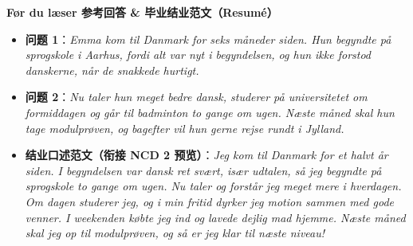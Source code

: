 \begin{answerbox}
\textbf{Før du læser 参考回答 \& 毕业结业范文（Resumé）}
\begin{itemize}
  \item \textbf{问题 1}：\textit{Emma kom til Danmark for seks måneder siden. Hun begyndte på sprogskole i Aarhus, fordi alt var nyt i begyndelsen, og hun ikke forstod danskerne, når de snakkede hurtigt.}
  \item \textbf{问题 2}：\textit{Nu taler hun meget bedre dansk, studerer på universitetet om formiddagen og går til badminton to gange om ugen. Næste måned skal hun tage modulprøven, og bagefter vil hun gerne rejse rundt i Jylland.}
  \item \textbf{结业口述范文（衔接 NCD 2 预览）}：\textit{Jeg kom til Danmark for et halvt år siden. I begyndelsen var dansk ret svært, især udtalen, så jeg begyndte på sprogskole to gange om ugen. Nu taler og forstår jeg meget mere i hverdagen. Om dagen studerer jeg, og i min fritid dyrker jeg motion sammen med gode venner. I weekenden købte jeg ind og lavede dejlig mad hjemme. Næste måned skal jeg op til modulprøven, og så er jeg klar til næste niveau!}
\end{itemize}
\end{answerbox}
